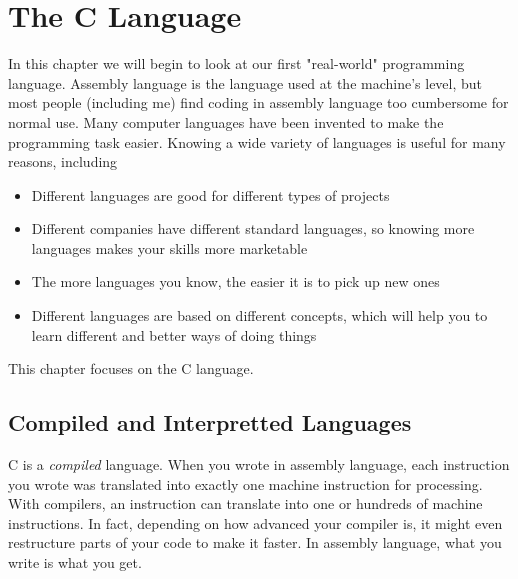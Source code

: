 \chapter{The C Language}

% 
% 
% 
% 

In this chapter we will begin to look at our first "real-world"
programming language.  Assembly language is the language used
at the machine's level, but most people (including me) find
coding in assembly language too cumbersome for normal use.
Many computer languages have been invented to make the programming
task easier.  Knowing a wide variety of languages is useful for
many reasons, including

\begin{itemize}\item Different languages are good for different types of projects 
\item Different companies have different standard languages, so knowing more languages makes your skills more marketable 
\item The more languages you know, the easier it is to pick up new ones 
\item Different languages are based on different concepts, which will help you to learn different and better ways of doing things 
\end{itemize}

This chapter focuses on the C language.

\section{Compiled and Interpretted Languages}

C is a \emph{compiled} language.  When you wrote in
assembly language, each instruction you wrote was translated into
exactly one machine instruction for processing.  With compilers,
an instruction can translate into one or hundreds of machine 
instructions.  In fact, depending on how advanced your compiler
is, it might even restructure parts of your code to make it faster.
In assembly language, what you write is what you get.

